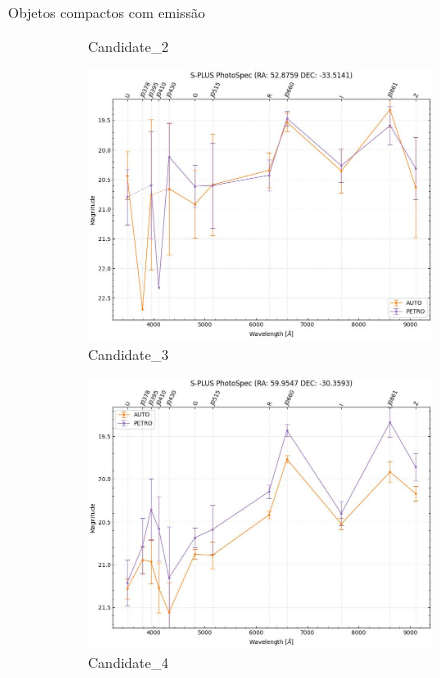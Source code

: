 \begin{frame}[c]{Objetos compactos com emissão}
\begin{figure}[h]
\begin{subfigure}[b]{0.25\textwidth}
        \caption{Candidate\_2}
    \end{subfigure}
    \begin{subfigure}[b]{0.25\textwidth}
        \includegraphics[width=\textwidth]{images/photo_specs/Candidate_3.png}
        \caption{Candidate\_3}
    \end{subfigure}
    \begin{subfigure}[b]{0.25\textwidth}
        \includegraphics[width=\textwidth]{images/photo_specs/Candidate_4.png}
        \caption{Candidate\_4}
    \end{subfigure}
    \begin{subfigure}[b]{0.25\textwidth}

\end{subfigure}
\end{figure}
\end{frame}
